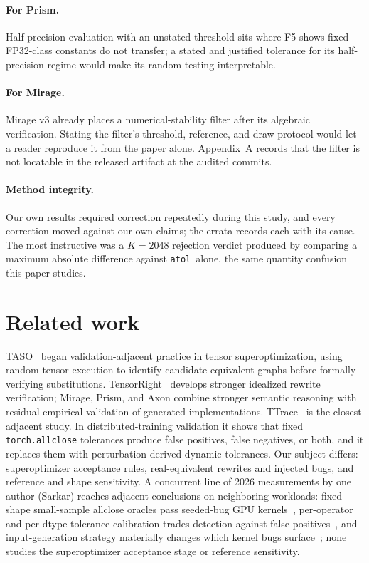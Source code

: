 \documentclass[twocolumn,10pt]{article}
\newcommand{\atol}{\texttt{atol}}
\begin{document}
\paragraph{For Prism.} Half-precision evaluation with an unstated
threshold sits where F5 shows fixed FP32-class constants do not
transfer; a stated and justified tolerance for its half-precision regime
would make its random testing interpretable.

\paragraph{For Mirage.} Mirage v3 already places a numerical-stability
filter after its algebraic verification. Stating the filter's threshold,
reference, and draw protocol would let a reader reproduce it from the
paper alone. Appendix~A records that the filter is not locatable in the
released artifact at the audited commits.

\paragraph{Method integrity.} Our own results required correction
repeatedly during this study, and every correction moved against our own
claims; the errata records each with its cause. The most instructive was
a $K{=}2048$ rejection verdict produced by comparing a maximum absolute
difference against \atol\ alone, the same quantity confusion this paper
studies.

\section{Related work}

TASO~\cite{taso} began validation-adjacent practice in tensor
superoptimization, using random-tensor execution to identify
candidate-equivalent graphs before formally verifying substitutions.
TensorRight~\cite{tensorright} develops stronger idealized rewrite
verification; Mirage, Prism, and Axon combine stronger semantic
reasoning with residual empirical validation of generated
implementations. TTrace~\cite{ttrace} is the closest adjacent study. In
distributed-training validation it shows that fixed
\texttt{torch.allclose} tolerances produce false positives, false
negatives, or both, and it replaces them with perturbation-derived
dynamic tolerances. Our subject differs: superoptimizer acceptance
rules, real-equivalent rewrites and injected bugs, and reference and
shape sensitivity. A concurrent line of 2026 measurements by one author
(Sarkar) reaches adjacent conclusions on neighboring workloads:
fixed-shape small-sample allclose oracles pass seeded-bug GPU
kernels~\cite{illusion}, per-operator and per-dtype tolerance
calibration trades detection against false positives~\cite{opaware}, and
input-generation strategy materially changes which kernel bugs
surface~\cite{testinput}; none studies the superoptimizer acceptance
stage or reference sensitivity.
\end{document}
